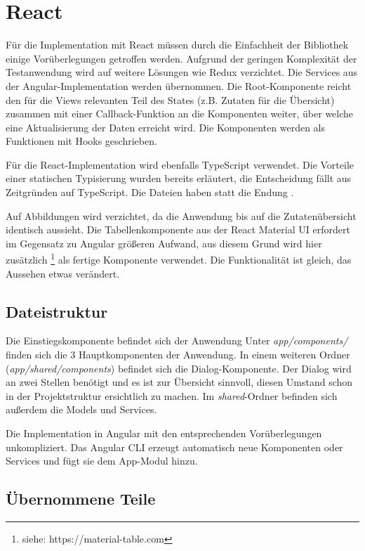 \section{React}
Für die Implementation mit React müssen durch die Einfachheit der Bibliothek einige Vorüberlegungen getroffen werden. Aufgrund der geringen Komplexität der Testanwendung wird auf weitere Lösungen wie Redux verzichtet. Die Services aus der Angular-Implementation werden übernommen. Die Root-Komponente reicht den für die Views relevanten Teil des States (z.B. Zutaten für die Übersicht) zusammen mit einer Callback-Funktion an die Komponenten weiter, über welche eine Aktualisierung der Daten erreicht wird. Die Komponenten werden als Funktionen mit Hooks geschrieben.

Für die React-Implementation wird ebenfalls TypeScript verwendet. Die Vorteile einer statischen Typisierung wurden bereits erläutert, die Entscheidung fällt aus Zeitgründen auf TypeScript. Die Dateien haben statt  die Endung .

Auf Abbildungen wird verzichtet, da die Anwendung bis auf die Zutatenübersicht identisch aussieht. Die Tabellenkomponente aus der React Material UI erfordert im Gegensatz zu Angular größeren Aufwand, aus diesem Grund wird hier zusätzlich \footnote{siehe: https://material-table.com} als fertige Komponente verwendet. Die Funktionalität ist gleich, das Aussehen etwas verändert. 

\subsection{Dateistruktur}
Die Einstiegskomponente  befindet sich der Anwendung  Unter \textit{app/components/} finden sich die 3 Hauptkomponenten der Anwendung. In einem weiteren Ordner (\textit{app/shared/components}) befindet sich die Dialog-Komponente. Der Dialog wird an zwei Stellen benötigt und es ist zur Übersicht sinnvoll, diesen Umstand schon in der Projektstruktur ersichtlich zu machen. Im \textit{shared}-Ordner befinden sich außerdem die Models und Services. 

Die Implementation in Angular mit den entsprechenden Vorüberlegungen unkompliziert. Das Angular CLI erzeugt automatisch neue Komponenten oder Services und fügt sie dem App-Modul hinzu. 

\subsection{Übernommene Teile}


